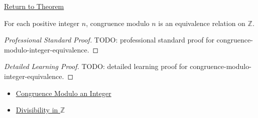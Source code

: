 \newpage
{}
\label{prf:congruence-modulo-integer-equivalence}

\begin{remark*}[Return]
\hyperref[thm:congruence-modulo-integer-equivalence]{Return to Theorem}
\end{remark*}

\begin{theorem*}
For each positive integer \(n\), congruence modulo \(n\) is an equivalence
relation on \(\mathbb{Z}\).
\end{theorem*}

\begin{proof}[Professional Standard Proof]
\LRAProofBodyStart
TODO: professional standard proof for congruence-modulo-integer-equivalence.
\end{proof}

\begin{proof}[Detailed Learning Proof]
\LRAProofBodyStart
TODO: detailed learning proof for congruence-modulo-integer-equivalence.
\end{proof}

\begin{remark*}
\end{remark*}

\begin{dependencies}
\begin{itemize}
\item \hyperref[def:congruence-modulo-integer]{Congruence Modulo an Integer}
  \item \hyperref[def:divisibility-in-z]{Divisibility in \(\mathbb{Z}\)}
\end{itemize}
\end{dependencies}

\clearpage
